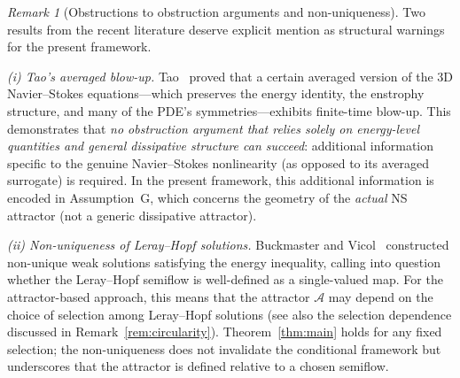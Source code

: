 \documentclass[12pt,a4paper]{article}
\theoremstyle{definition}
\theoremstyle{plain}
\theoremstyle{remark}
\newtheorem{remark}[definition]{Remark}
\begin{document}
\begin{remark}[Obstructions to obstruction arguments and non-uniqueness]
\label{rem:tao-buckmaster-vicol}
Two results from the recent literature deserve explicit mention as
structural warnings for the present framework.

\emph{(i) Tao's averaged blow-up.}\;
Tao~\cite{Tao2016} proved that a certain averaged version of the 3D
Navier--Stokes equations---which preserves the energy identity, the
enstrophy structure, and many of the PDE's symmetries---exhibits
finite-time blow-up.  This demonstrates that \emph{no obstruction
argument that relies solely on energy-level quantities and general
dissipative structure can succeed}: additional information specific to
the genuine Navier--Stokes nonlinearity (as opposed to its averaged
surrogate) is required.  In the present framework, this additional
information is encoded in Assumption~G, which concerns the geometry
of the \emph{actual} NS attractor (not a generic dissipative attractor).

\emph{(ii) Non-uniqueness of Leray--Hopf solutions.}\;
Buckmaster and Vicol~\cite{BuckmasterVicol2019} constructed
non-unique weak solutions satisfying the energy inequality, calling
into question whether the Leray--Hopf semiflow is well-defined as a
single-valued map.  For the attractor-based approach, this means that
the attractor $\mathcal{A}$ may depend on the choice of selection
among Leray--Hopf solutions (see also the selection dependence
discussed in Remark~\ref{rem:circularity}).  Theorem~\ref{thm:main}
holds for any fixed selection; the non-uniqueness does not invalidate
the conditional framework but underscores that the attractor is
defined relative to a chosen semiflow.
\end{remark}
\end{document}
